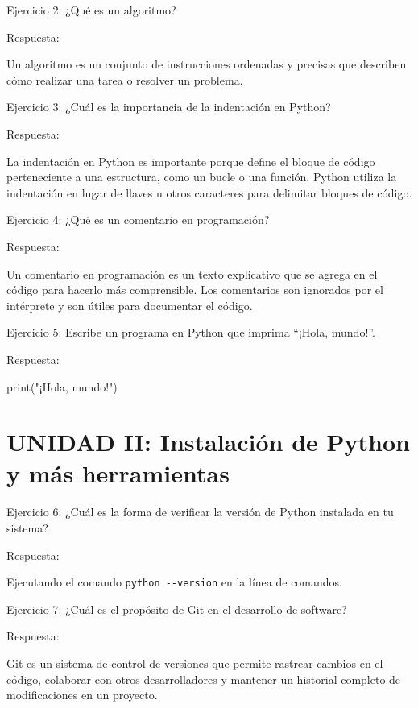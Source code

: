 \documentclass[
  a4paper,
  DIV=11,
  numbers=noendperiod,
  onepage,
  openany]{scrreprt}
\newenvironment{Shaded}{\begin{snugshade}}{\end{snugshade}}
\newcommand{\BuiltInTok}[1]{\textcolor[rgb]{0.00,0.23,0.31}{#1}}
\newcommand{\NormalTok}[1]{\textcolor[rgb]{0.00,0.23,0.31}{#1}}
\newcommand{\StringTok}[1]{\textcolor[rgb]{0.13,0.47,0.30}{#1}}
\begin{document}
Ejercicio 2: ¿Qué es un algoritmo?

Respuesta:

Un algoritmo es un conjunto de instrucciones ordenadas y precisas que
describen cómo realizar una tarea o resolver un problema.

Ejercicio 3: ¿Cuál es la importancia de la indentación en Python?

Respuesta:

La indentación en Python es importante porque define el bloque de código
perteneciente a una estructura, como un bucle o una función. Python
utiliza la indentación en lugar de llaves u otros caracteres para
delimitar bloques de código.

Ejercicio 4: ¿Qué es un comentario en programación?

Respuesta:

Un comentario en programación es un texto explicativo que se agrega en
el código para hacerlo más comprensible. Los comentarios son ignorados
por el intérprete y son útiles para documentar el código.

Ejercicio 5: Escribe un programa en Python que imprima ``¡Hola,
mundo!''.

Respuesta:

\begin{Shaded}
\begin{Highlighting}[]
\BuiltInTok{print}\NormalTok{(}\StringTok{"¡Hola, mundo!"}\NormalTok{)}
\end{Highlighting}
\end{Shaded}

\section{UNIDAD II: Instalación de Python y más
herramientas}\label{unidad-ii-instalaciuxf3n-de-python-y-muxe1s-herramientas}

Ejercicio 6: ¿Cuál es la forma de verificar la versión de Python
instalada en tu sistema?

Respuesta:

Ejecutando el comando \texttt{python\ -\/-version} en la línea de
comandos.

Ejercicio 7: ¿Cuál es el propósito de Git en el desarrollo de software?

Respuesta:

Git es un sistema de control de versiones que permite rastrear cambios
en el código, colaborar con otros desarrolladores y mantener un
historial completo de modificaciones en un proyecto.
\end{document}
